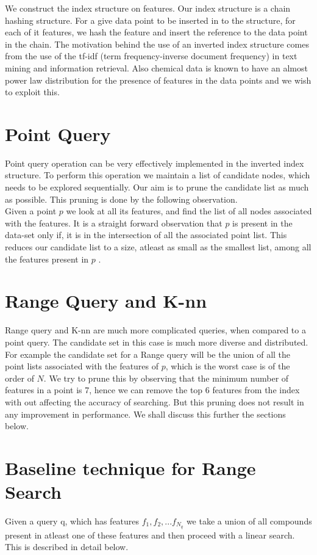 
We construct the index structure on features. Our index structure is a chain hashing structure. For a give data point to be inserted in to the structure, for each of it features, we hash the feature and insert the reference to the data point in the chain. The motivation behind the use of an inverted index structure comes from the use of the tf-idf (term frequency-inverse document frequency) in text mining and information retrieval. Also chemical data is known to have an almost power law distribution for the presence of features in the data points and we wish to exploit this.

\section{Point Query}

Point query operation can be very effectively 
implemented in the inverted index structure. To perform this operation we maintain a list of candidate nodes, which needs to be explored sequentially. Our aim is to prune the candidate list as much as possible. This pruning is done by the following observation.\\
Given a point $p$ we look at all its features, and find the list of all nodes associated with the features. It is a straight forward observation that $p$ is present in the data-set only if, it is in the intersection of all the associated point list. This reduces our candidate list to a size, atleast as small as the smallest list, among all the features present in $p$ .\\

\section{Range Query and K-nn}
Range query and K-nn are much more complicated queries, when compared to a point query. The candidate set in this case is much more diverse and distributed. For example the candidate set for a Range query will be the union of all the point lists associated with the features of $p$, which is the worst case is of the order of $N$. We try to prune this by observing that the minimum number of features in a point is 7, hence we can remove the top 6 features from the index with out affecting the accuracy of searching. But this pruning does not result in any improvement in performance. We shall discuss this further the sections below.\\

\section{Baseline technique for Range Search}
\label{sec:base}
 Given a query q, which has features $f_1, f_2,...f_{N_q}$ we take a union of all compounds present in atleast one of these features and then proceed with a linear search. This is described in detail below.

